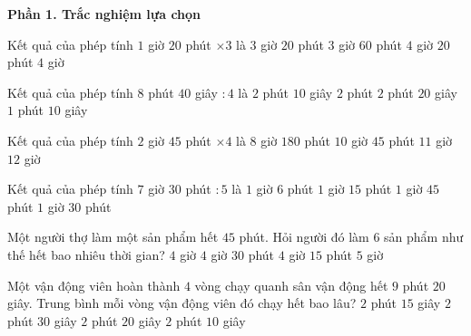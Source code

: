 \textbf{Phần 1. Trắc nghiệm lựa chọn}

\begin{ex} %
Kết quả của phép tính $1$ giờ $20$ phút $\times 3$ là
\choice
{$3$ giờ $20$ phút}
{$3$ giờ $60$ phút}
{$4$ giờ $20$ phút}
{\True $4$ giờ}
\end{ex}

\begin{ex} %
Kết quả của phép tính $8$ phút $40$ giây $: 4$ là
\choice
{\True $2$ phút $10$ giây}
{$2$ phút}
{$2$ phút $20$ giây}
{$1$ phút $10$ giây}
\end{ex}

\begin{ex} %
Kết quả của phép tính $2$ giờ $45$ phút $\times 4$ là
\choice
{$8$ giờ $180$ phút}
{$10$ giờ $45$ phút}
{\True $11$ giờ}
{$12$ giờ}
\end{ex}

\begin{ex} %
Kết quả của phép tính $7$ giờ $30$ phút $: 5$ là
\choice
{$1$ giờ $6$ phút}
{$1$ giờ $15$ phút}
{$1$ giờ $45$ phút}
{\True $1$ giờ $30$ phút}
\end{ex}

\begin{ex} %
Một người thợ làm một sản phẩm hết $45$ phút. Hỏi người đó làm $6$ sản phẩm như thế hết bao nhiêu thời gian?
\choice
{$4$ giờ}
{\True $4$ giờ $30$ phút}
{$4$ giờ $15$ phút}
{$5$ giờ}
\end{ex}

\begin{ex} %
Một vận động viên hoàn thành $4$ vòng chạy quanh sân vận động hết $9$ phút $20$ giây. Trung bình mỗi vòng vận động viên đó chạy hết bao lâu?
\choice
{$2$ phút $15$ giây}
{$2$ phút $30$ giây}
{\True $2$ phút $20$ giây}
{$2$ phút $10$ giây}
\end{ex}


